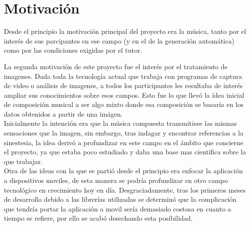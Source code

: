 \section{Motivación}



Desde el principio la motivación principal del proyecto era la música, tanto por el interés de sus parcipantes en ese campo (y en el de la generación automática) como por las condiciones exigidas por el tutor.

La segunda motivación de este proyecto fue el interés por el tratamiento de imagenes. Dada toda la tecnología actual que trabaja con programas de captura de video o análisis de imagenes, a todos los participantes les resultaba de interés ampliar sus conocimientos sobre esos campos. Esto fue lo que llevó la ídea inicial de composición musical a ser algo mixto donde esa composición se basaría en los datos obtenidos a partir de una imágen.
\\Inicialmente la intención era que la música compuesta transmitiese las mismas sensaciones que la imagen, sin embargo, tras indagar y encontrar referencias a la sinestesia, la idea derivó a profundizar en este campo en el ámbito que concierne el proyecto, ya que estaba poco estudiado y daba una base mas científica sobre la que trabajar.\\

Otra de las ideas con la que se partió desde el principio era enfocar la aplicación a dispositivos moviles, de esta manera se podría profundizar en otro campo tecnológico en crecimiento hoy en día. Desgraciadamente, tras los primeros meses de desarrollo debido a las librerías utilizadas
se determinó que la complicación que tendría portar la aplicación a movil sería demasiado costosa en cuanto a tiempo se refiere, por ello se acabó desechando esta posibilidad.\\


